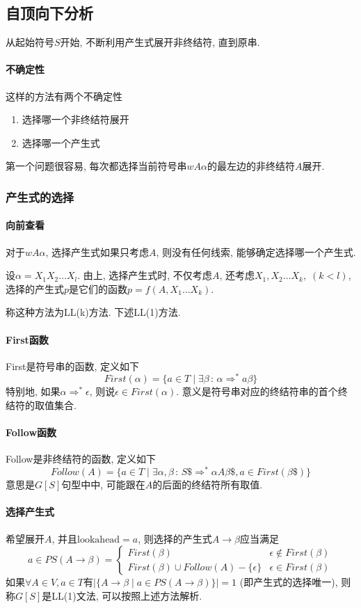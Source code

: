 \documentclass{ctexart}
\begin{document}
\subsection{自顶向下分析}
    从起始符号$S$开始, 不断利用产生式展开非终结符, 直到原串.\par
\paragraph{不确定性} 这样的方法有两个不确定性 \begin{enumerate}
        \item 选择哪一个非终结符展开
        \item 选择哪一个产生式
    \end{enumerate}\par
    第一个问题很容易, 每次都选择当前符号串$w A \alpha$的最左边的非终结符$A$展开.
\subsubsection{产生式的选择}
\paragraph{向前查看} 对于$wA\alpha$, 选择产生式如果只考虑$A$, 则没有任何线索, 能够确定选择哪一个产生式.\par
    设$\alpha = X_1 X_2 \ldots X_l$.
    由上, 选择产生式时,
    不仅考虑$A$, 还考虑$X_1, X_2 \ldots X_k,\; (k < l)$,
    选择的产生式$p$是它们的函数$p = f(A, X_1 \ldots X_k)$.\par
    称这种方法为LL(k)方法. 下述LL(1)方法.
\paragraph{First函数} First是符号串的函数, 定义如下\[
    First(\alpha) = \{a \in T \;|\; \exists \beta\,:\,\alpha \Rightarrow^* a\beta\}\]
    特别地, 如果$\alpha \Rightarrow^* \epsilon$, 则说$\epsilon \in First(\alpha)$.
    意义是符号串对应的终结符串的首个终结符的取值集合.
\paragraph{Follow函数} Follow是非终结符的函数, 定义如下\[
    Follow(A) = \{a \in T \;|\; \exists \alpha, \beta \,:\, S\$ \Rightarrow^* \alpha A \beta\$, a \in First(\beta\$)\}
    \]
    意思是$G[S]$句型中中, 可能跟在$A$的后面的终结符所有取值.
\paragraph{选择产生式} 希望展开$A$, 并且$\text{lookahead} = a$, 则选择的产生式$A \to \beta$应当满足\[
    a \in PS(A \to \beta) = \begin{cases}
        First(\beta) & \epsilon \not\in First(\beta)\\
        First(\beta) \cup Follow(A) - \{\epsilon\} & \epsilon \in First(\beta)
    \end{cases} \]
    如果$\forall A \in V, a \in T$有$\Big|\{A \to \beta \;|\; a \in PS(A \to \beta)\}\Big| = 1$ (即产生式的选择唯一),
    则称$G[S]$是LL(1)文法, 可以按照上述方法解析.
\end{document}
